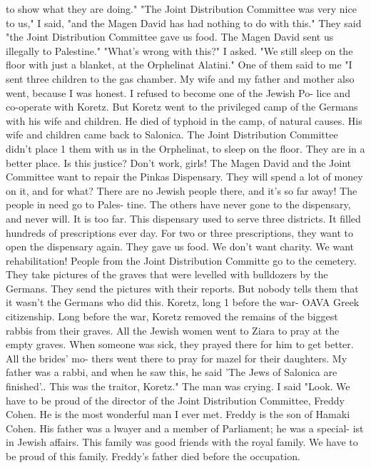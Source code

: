to show what they are doing."
"The Joint Distribution Committee was very nice to us," I said, "and the Magen 
David has had nothing to do with this."
They said "the Joint Distribution Committee gave us food.
The Magen David sent 
us illegally to Palestine."
"What's wrong with this?"
I asked.
"We still sleep on the floor with just a blanket, at the Orphelinat Alatini."
One 
of them said to me "I sent three children to the gas chamber.
My wife and my father 
and mother also went, because I was honest.
I refused to become one of the Jewish Po-
lice and co-operate with Koretz.
But Koretz went to the privileged camp of the Germans 
with his wife and children.
He died of typhoid in the camp, of natural causes.
His 
wife and children came back to Salonica.
The Joint Distribution Committee didn't place 1 
them with us in the Orphelinat, to sleep on the floor.
They are in a better place.
Is this justice?
Don't work, girls!
The Magen David and the Joint Committee want to 
repair the Pinkas Dispensary.
They will spend a lot of money on it, and for what?
There are no Jewish people there, and it's so far away!
The people in need go to Pales-
tine.
The others have never gone to the dispensary, and never will.
It is too far.
This dispensary used to serve three districts.
It filled hundreds of prescriptions ever 
day.
For two or three prescriptions, they want to open the dispensary again.
They gave us food.
We don't want charity.
We want rehabilitation!
People from 
the Joint Distribution Committe go to the cemetery.
They take pictures of the graves 
that were levelled with bulldozers by the Germans.
They send the pictures with their 
reports.
But nobody tells them that it wasn't the Germans who did this.
Koretz, long 
1 
before the war- OAVA 
Greek citizenship.
Long before the war, Koretz removed the remains of the biggest 
rabbis from their graves.
All the Jewish women went to Ziara to pray at the empty graves.
When someone was sick, they prayed there for him to get better.
All the brides' mo-
thers went there to pray for mazel for their daughters.
My father was a rabbi, and when 
he saw this, he said 'The Jews of Salonica are finished'.. This was the traitor, 
Koretz."
The man was crying.
I said "Look.
We have to be proud of the director of the Joint Distribution 
Committee, Freddy Cohen.
He is the most wonderful man I ever met.
Freddy is the son 
of Hamaki Cohen.
His father was a lwayer and a member of Parliament; he was a special-
ist in Jewish affairs.
This family was good friends with the royal family.
We have to 
be proud of this family.
Freddy's father died before the occupation.
